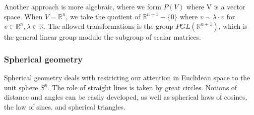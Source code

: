 \documentclass[12pt]{article}
\begin{document}
Another approach is more algebraic, where we form $P(V)$ where V is a
vector space. When $V = \mathbb{R}^n$, we take the quotient of $
\mathbb{R}^{n+1} - \{0\}$ where $v \sim \lambda \cdot v$ for $v \in
\mathbb{R}^n, \lambda \in \mathbb{R}$.  The allowed transformations is
the group $PGL(\mathbb{R}^{n+1})$, which is the general linear group
modulo the subgroup of scalar matrices.

\subsubsection{Spherical geometry}
Spherical geometry deals with restricting our attention in Euclidean
space to the unit sphere $S^n$. The role of straight lines is taken by
great circles. Notions of distance and angles can be easily developed,
as well as spherical laws of cosines, the law of sines, and spherical
triangles.
\end{document}

